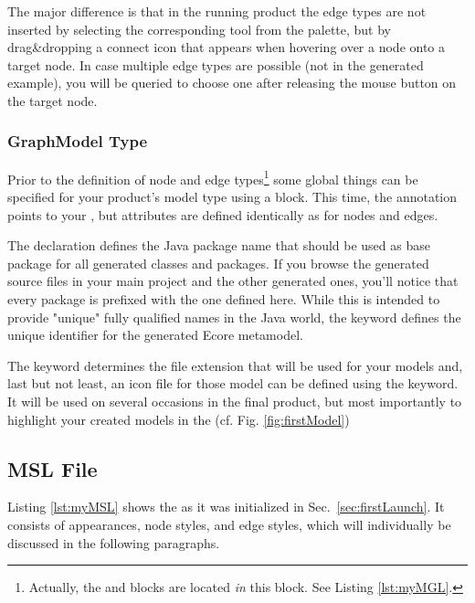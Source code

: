 \documentclass[a4paper,american,12pt]{scrreprt}
\begin{document}
The major difference is that in the running \cinco product the edge types are
not inserted by selecting the corresponding tool from the palette, but by
drag\&dropping a connect icon that appears when hovering over a node onto a
target node. In case multiple edge types are possible (not in the generated
example), you will be queried to choose one after releasing the mouse button on
the target node.

\subsubsection{GraphModel Type}

Prior to the definition of node and edge types\footnote{Actually, the 
and  blocks are located \emph{in} this  block. See
Listing \ref{lst:myMGL}.} some global things can be specified for your \cinco
product's model type using a   block.  This time,
the  annotation points to your , but
attributes are defined identically as for nodes and edges.

The  declaration defines the Java package name that should be used
as base package for all generated classes and packages. If you browse the
generated source files in your main project and the other generated ones, you'll
notice that every package is prefixed with the one defined here. While this is
intended to provide "unique" fully qualified names in the Java world, the
 keyword defines the unique identifier for the generated Ecore
metamodel.

The  keyword determines the file extension that will be
used for your models and, last but not least, an icon file for those model can
be defined using the  keyword. It will be used on several occasions
in the final product, but most importantly to highlight your created models in
the  (cf. Fig. \ref{fig:firstModel}) 

\subsection{MSL File} \label{sec:msl}


Listing \ref{lst:myMSL} shows the  as it was initialized
in Sec.~\ref{sec:firstLaunch}. It consists of appearances, node styles, and
edge styles, which will individually be discussed in the following paragraphs.
\end{document}
